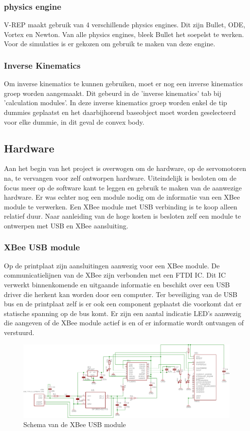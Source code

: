 \documentclass[10pt,a4paper]{article}
\begin{document}
\subsubsection{physics engine}
V-REP maakt gebruik van 4 verschillende physics engines. Dit zijn Bullet, ODE, Vortex en Newton. Van alle physics engines, bleek Bullet het soepelst te werken. Voor de simulaties is er gekozen om gebruik te maken van deze engine.

\subsubsection{Inverse Kinematics}
Om inverse kinematics te kunnen gebruiken, moet er nog een inverse kinematics groep worden aangemaakt. Dit gebeurd in de 'inverse kinematics' tab bij 'calculation modules'. In deze inverse kinematics groep worden enkel de tip dummies geplaatst en het daarbijhorend baseobject moet worden geselecteerd voor elke dummie, in dit geval de convex body.

\newpage
\subsection{Hardware}
Aan het begin van het project is overwogen om de hardware, op de servomotoren na, te vervangen voor zelf ontworpen hardware. Uiteindelijk is besloten om de focus meer op de software kant te leggen en gebruik te maken van de aanwezige hardware. Er was echter nog een module nodig om de informatie van een XBee module te verwerken. Een XBee module met USB verbinding is te koop alleen relatief duur. Naar aanleiding van de hoge kosten is besloten zelf een module te ontwerpen met USB en XBee aansluiting.

\subsubsection{XBee USB module}
Op de printplaat zijn aansluitingen aanwezig voor een XBee module. De communicatielijnen van de XBee zijn verbonden met een FTDI IC. Dit IC verwerkt binnenkomende en uitgaande informatie en beschikt over een USB driver die herkent kan worden door een computer. Ter beveiliging van de USB bus en de printplaat zelf is er ook een component geplaatst die voorkomt dat er statische spanning op de bus komt. Er zijn een aantal indicatie LED's aanwezig die aangeven of de XBee module actief is en of er informatie wordt ontvangen of verstuurd.

\begin{figure}[h]
    \centering
    \includegraphics[width=1\textwidth]{schematic-xbee}
    \caption{Schema van de XBee USB module}
    \label{fig:schematic-xbee}
\end{figure}
\end{document}
